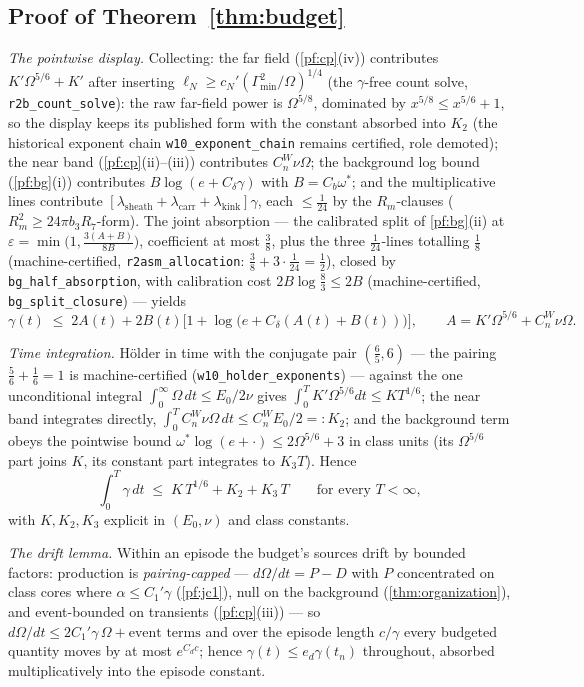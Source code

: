 \documentclass[11pt,letterpaper]{amsart}
\theoremstyle{definition}
\theoremstyle{remark}
\newcommand{\om}{\omega}
\begin{document}
\subsection{Proof of Theorem~\ref{thm:budget}}\label{pf:budget}
\emph{The pointwise display.} Collecting: the far field
(\cref{pf:cp}(iv)) contributes $K'\Omega^{5/6}+K'$ after inserting
$\ell_N\ge c_N'(\Gamma_{\min}^2/\Omega)^{1/4}$ (the $\gamma$-free count solve,
\texttt{r2b\_count\_solve}): the raw far-field power is $\Omega^{5/8}$,
dominated by $x^{5/8}\le x^{5/6}+1$, so the display keeps its published form
with the constant absorbed into $K_2$ (the historical exponent chain
\texttt{w10\_exponent\_chain} remains certified, role demoted); the near band
(\cref{pf:cp}(ii)--(iii)) contributes $C_n^{W}\nu\Omega$; the background
log bound (\cref{pf:bg}(i)) contributes $B\log(e+C_\delta\gamma)$ with $B=C_b\om^*$;
and the multiplicative lines contribute
$[\lambda_{\mathrm{sheath}}+\lambda_{\mathrm{carr}}+\lambda_{\mathrm{kink}}]\gamma$,
each $\le\tfrac1{24}$ by the $R_m$-clauses ($R_m^2\ge24\pi b_3R_7$-form). The
joint absorption --- the calibrated split of \cref{pf:bg}(ii) at
$\varepsilon=\min\bigl(1,\tfrac{3(A+B)}{8B}\bigr)$, coefficient at most
$\tfrac38$, plus the three $\tfrac1{24}$-lines totalling $\tfrac18$
(machine-certified, \texttt{r2asm\_allocation}: $\tfrac38+3\cdot\tfrac1{24}
=\tfrac12$), closed by \texttt{bg\_half\_absorption}, with calibration cost
$2B\log\tfrac83\le2B$ (machine-certified, \texttt{bg\_split\_closure}) ---
yields
\[
\gamma(t)\;\le\;2A(t)+2B(t)\bigl[1+\log\bigl(e+C_\delta(A(t)+B(t))\bigr)\bigr],
\qquad A=K'\Omega^{5/6}+C_n^{W}\nu\Omega .
\]

\emph{Time integration.} H\"older in time with the conjugate pair
$(\tfrac65,6)$ --- the pairing $\tfrac56+\tfrac16=1$ is machine-certified
(\texttt{w10\_holder\_exponents}) --- against the one unconditional integral
$\int_0^\infty\Omega\,dt\le E_0/2\nu$ gives
$\int_0^TK'\Omega^{5/6}dt\le KT^{1/6}$; the near band integrates directly,
$\int_0^TC_n^{W}\nu\Omega\,dt\le C_n^{W}E_0/2=:K_2$; and the background term obeys the
pointwise bound $\om^*\log(e+\cdot)\le2\Omega^{5/6}+3$ in class units (its
$\Omega^{5/6}$ part joins $K$, its constant part integrates to $K_3T$). Hence
\[
\int_0^T\gamma\,dt\;\le\;K\,T^{1/6}+K_2+K_3\,T\qquad\text{for every }T<\infty,
\]
with $K,K_2,K_3$ explicit in $(E_0,\nu)$ and class constants.

\emph{The drift lemma.} Within an episode the budget's sources drift by bounded
factors: production is \emph{pairing-capped} --- $d\Omega/dt=P-D$ with $P$
concentrated on class cores where $\alpha\le C_1'\gamma$ (\cref{pf:jc1}), null on
the background (\cref{thm:organization}), and event-bounded on transients
(\cref{pf:cp}(iii)) --- so $d\Omega/dt\le2C_1'\gamma\,\Omega+\text{event terms}$ and
over the episode length $c/\gamma$ every budgeted quantity moves by at most
$e^{C_dc}$; hence $\gamma(t)\le e_d\gamma(t_n)$ throughout, absorbed
multiplicatively into the episode constant.
\end{document}
